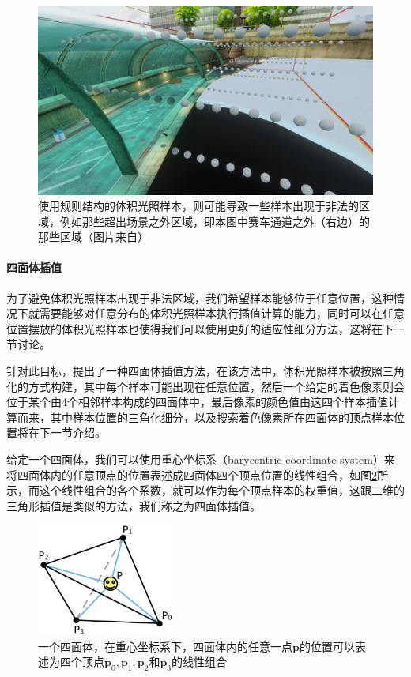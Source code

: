 \begin{figure}
	\includegraphics[width=\textwidth]{figures/pl/cars2}
	\caption{使用规则结构的体积光照样本，则可能导致一些样本出现于非法的区域，例如那些超出场景之外区域，即本图中赛车通道之外（右边）的那些区域（图片来自\cite{a:RenderinginCars2}）}
	\label{f:pl-cars2}
\end{figure}




\paragraph{四面体插值}
为了避免体积光照样本出现于非法区域，我们希望样本能够位于任意位置，这种情况下就需要能够对任意分布的体积光照样本执行插值计算的能力，同时可以在任意位置摆放的体积光照样本也使得我们可以使用更好的适应性细分方法，这将在下一节讨论。

针对此目标，\cite{a:Lightprobeinterpolationusingtetrahedraltessellations}提出了一种四面体插值方法，在该方法中，体积光照样本被按照三角化的方式构建，其中每个样本可能出现在任意位置，然后一个给定的着色像素则会位于某个由4个相邻样本构成的四面体中，最后像素的颜色值由这四个样本插值计算而来，其中样本位置的三角化细分，以及搜索着色像素所在四面体的顶点样本位置将在下一节介绍。

给定一个四面体，我们可以使用重心坐标系（barycentric coordinate system）来将四面体内的任意顶点的位置表述成四面体四个顶点位置的线性组合，如图\ref{f:pl-barycentric-coordinates}所示，而这个线性组合的各个系数，就可以作为每个顶点样本的权重值，这跟二维的三角形插值是类似的方法，我们称之为四面体插值。

\begin{figure}
	\sidecaption
	\includegraphics[width=0.4\textwidth]{figures/pl/barycentric-coordinates}
	\caption{一个四面体，在重心坐标系下，四面体内的任意一点$\mathbf{p}$的位置可以表述为四个顶点$\mathbf{p}_0,\mathbf{p}_1,\mathbf{p}_2$和$\mathbf{p}_3$的线性组合}
	\label{f:pl-barycentric-coordinates}
\end{figure}

